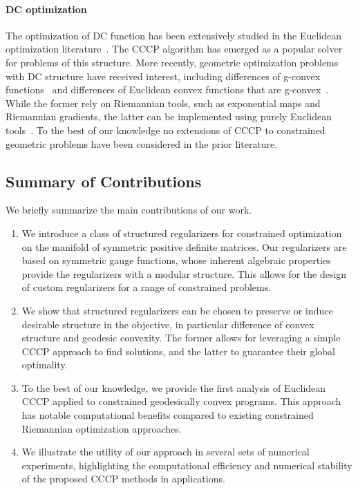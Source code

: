 \documentclass[sn-nature]{sn-jnl}%
\theoremstyle{thmstyleone}%
\theoremstyle{thmstyletwo}%
\theoremstyle{thmstylethree}%
\begin{document}
\paragraph{DC optimization}
The optimization of DC function has been extensively studied in the Euclidean optimization literature~\citep{DC-review}. The CCCP algorithm has emerged as a popular solver for problems of this structure. More recently, geometric optimization problems with DC structure have received interest, including differences of g-convex functions~\citep{cruzneto,souza2015proximal,ferreira2021difference} and differences of Euclidean convex functions that are g-convex~\citep{pmlr-v202-weber23a}. While the former rely on Riemannian tools, such as exponential maps and Riemannian gradients, the latter can be implemented using purely Euclidean tools~\citep{pmlr-v202-weber23a}. To the best of our knowledge no extensions of CCCP to constrained geometric problems have been considered in the prior literature. 


\subsection{Summary of Contributions}
We briefly summarize the main contributions of our work.
\begin{enumerate}
    \item We introduce a class of structured regularizers for constrained optimization on the manifold of symmetric positive definite matrices. Our regularizers are based on symmetric gauge functions, whose inherent algebraic properties provide the regularizers with a modular structure. This allows for the design of custom regularizers for a range of constrained problems.
    \item We show that structured regularizers can be chosen to preserve or induce desirable structure in the objective, in particular difference of convex structure and geodesic convexity. The former allows for leveraging a simple CCCP approach to find solutions, and the latter to guarantee their global optimality.
    \item To the best of our knowledge, we provide the first analysis of Euclidean CCCP applied to constrained geodesically convex programs. This approach has notable  computational benefits compared to existing constrained Riemannian optimization approaches.
    \item We illustrate the utility of our approach in several sets of numerical experiments, highlighting the computational efficiency and numerical stability of the proposed CCCP methods in applications. %
\end{enumerate}
\end{document}
